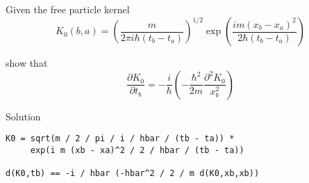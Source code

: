 \documentclass[12pt]{article}
\begin{document}
\noindent
Given the free particle kernel
\begin{equation*}
K_0(b,a)=\left(\frac{m}{2\pi i\hbar(t_b-t_a)}\right)^{1/2}
\exp\left(\frac{im(x_b-x_a)^2}{2\hbar(t_b-t_a)}\right)
\end{equation*}

\noindent
show that
\begin{equation*}
\frac{\partial K_0}{\partial t_b}
=-\frac{i}{\hbar}
\left(
-\frac{\hbar^2}{2m}
\frac{\partial^2 K_0}{x_b^2}
\right)
\end{equation*}

\bigskip
\noindent
Solution
\begin{verbatim}
K0 = sqrt(m / 2 / pi / i / hbar / (tb - ta)) *
     exp(i m (xb - xa)^2 / 2 / hbar / (tb - ta))

d(K0,tb) == -i / hbar (-hbar^2 / 2 / m d(K0,xb,xb))
\end{verbatim}
\end{document}
